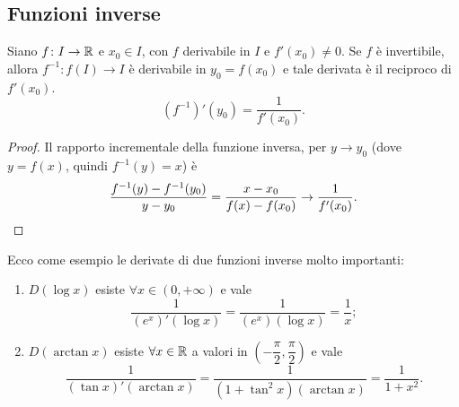 \subsection{Funzioni inverse}
\begin{proprieta}
Siano $f\colon I\to\mathbb{R}$ e $x_0\in I$, con $f$ derivabile in $I$ e $f'(x_0)\neq 0$. Se $f$ è invertibile, allora $f^{-1}\colon f(I)\to I$ è derivabile in $y_0=f(x_0)$ e tale derivata è il reciproco di $f'(x_0)$.
\begin{equation}
(f^{-1})'(y_0)=\frac1{f'(x_0)}.
\end{equation}
\end{proprieta}
\begin{proof}
Il rapporto incrementale della funzione inversa, per $y\to y_0$ (dove $y=f(x)$, quindi $f^{-1}(y)=x$) è
\[
\frac{f^{-1}(y)-f^{-1}(y_0)}{y-y_0}=\frac{x-x_0}{f(x)-f(x_0)}\to\frac1{f'(x_0)}.\qedhere
\]
\end{proof}
\begin{esempio} \label{es:derivata-funzione-inversa}
	Ecco come esempio le derivate di due funzioni inverse molto importanti:
	\begin{enumerate}
		\item $D(\log x)$ esiste $\forall x\in (0,+\infty)$ e vale
		\[
		\frac1{(e^x)'(\log x)}=\frac1{(e^x)(\log x)}=\frac1{x};
		\]
		\item $D(\arctan x)$ esiste $\forall x\in\mathbb{R}$ a valori in $\left(-\dfrac{\pi}2,\dfrac{\pi}2\right)$ e vale
		\[
		\frac1{(\tan x)'(\arctan x)}=\frac1{(1+\tan^2x)(\arctan x)}=\frac1{1+x^2}.
		\]
	\end{enumerate}
\end{esempio}

